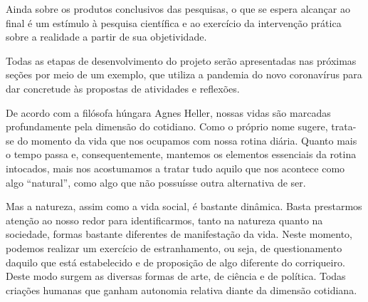 Ainda sobre os produtos conclusivos das pesquisas, o que se espera alcançar ao final é um estímulo à pesquisa científica e ao exercício da intervenção prática sobre a realidade a partir de sua objetividade.

Todas as etapas de desenvolvimento do projeto serão apresentadas nas próximas seções por meio de um exemplo, que utiliza a pandemia do novo coronavírus para dar concretude às propostas de atividades e reflexões.


De acordo com a filósofa húngara Agnes Heller, nossas vidas são marcadas profundamente pela dimensão do cotidiano. Como o próprio nome sugere, trata-se do momento da vida que nos ocupamos com nossa rotina diária. Quanto mais o tempo passa e, consequentemente, mantemos os elementos essenciais da rotina intocados, mais nos acostumamos a tratar tudo aquilo que nos acontece como algo “natural”, como algo que não possuísse outra alternativa de ser.

Mas a natureza, assim como a vida social, é bastante dinâmica. Basta prestarmos atenção ao nosso redor para identificarmos, tanto na natureza quanto na sociedade, formas bastante diferentes de manifestação da vida. Neste momento, podemos realizar um exercício de estranhamento, ou seja, de questionamento daquilo que está estabelecido e de proposição de algo diferente do corriqueiro. Deste modo surgem as diversas formas de arte, de ciência e de política. Todas criações humanas que ganham autonomia relativa diante da dimensão cotidiana.

